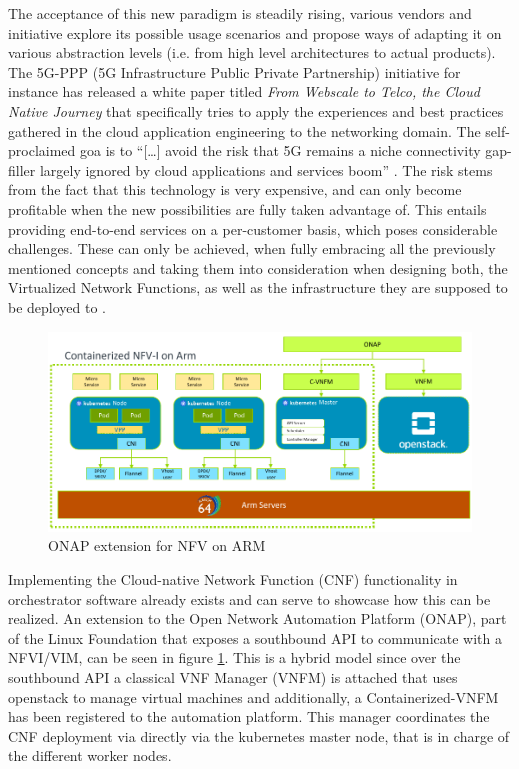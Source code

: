 The acceptance of this new paradigm is steadily rising, various vendors and initiative explore its possible usage scenarios and propose ways of adapting it on various abstraction levels (i.e. from high level architectures to actual products). 
The 5G-PPP (5G Infrastructure Public Private Partnership) initiative for instance has released a white paper titled \textit{From Webscale to Telco, the Cloud Native Journey} \cite{5gppp} that specifically tries to apply the experiences and best practices gathered in the cloud application engineering to the networking domain. The self-proclaimed goa is to ``[\dots] avoid the risk that 5G remains a niche connectivity gap-filler largely ignored by cloud applications and services boom'' \cite{5gppp}. The risk stems from the fact that this technology is very expensive, and can only become profitable when the new possibilities are fully taken advantage of. This entails providing end-to-end services on a per-customer basis, which poses considerable challenges. These can only be achieved, when fully embracing all the previously mentioned concepts and taking them into consideration when designing both, the Virtualized Network Functions, as well as the infrastructure they are supposed to be deployed to \cite{5gppp}.




\begin{figure}[h]
	\includegraphics[width=\linewidth]{images/nfv4arm.png}
	\caption{ONAP extension for NFV on ARM \cite{nfv4arm}}
	\label{fig:nfv4arm}
\end{figure}

Implementing the Cloud-native Network Function (CNF) functionality in orchestrator software already exists and can serve to showcase how this can be realized. An extension to the Open Network Automation Platform (ONAP), part of the Linux Foundation that exposes a southbound API to communicate with a NFVI/VIM, can be seen in figure \ref{fig:nfv4arm}. This is a hybrid model since over the southbound API a classical VNF Manager (VNFM) is attached that uses openstack to manage virtual machines and additionally, a Containerized-VNFM has been registered to the automation platform. This manager coordinates the CNF deployment via directly via the kubernetes master node, that is in charge of the different worker nodes. 


